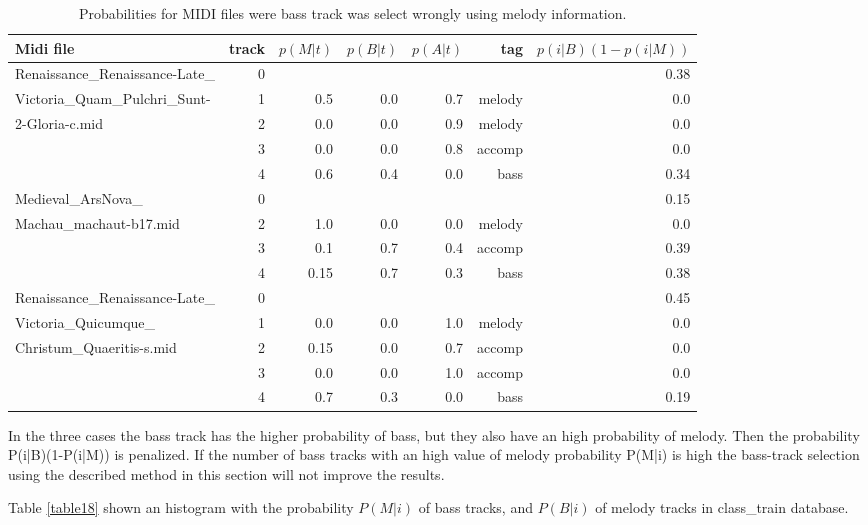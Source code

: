 \documentclass{article}
\begin{document}
\begin{table}
\tiny
\begin{center}
\begin{tabular}{  l | r | r | r | r | r | r }
\hline
Midi file & track & $p(M|t)$ & $p(B|t)$ & $p(A|t)$ & tag & $p(i|B)(1-p(i|M))$ \\
\hline
\hline
Renaissance\_Renaissance-Late\_ & 0 &  &  &  &  & 0.38 \\
Victoria\_Quam\_Pulchri\_Sunt- & 1 & 0.5 & 0.0 & 0.7 & melody & 0.0 \\
 2-Gloria-c.mid  & 2 & 0.0 & 0.0 & 0.9 & melody & 0.0 \\
 & 3 & 0.0 & 0.0 & 0.8 & accomp & 0.0 \\
 & 4 & 0.6 & 0.4 & 0.0 & bass & 0.34 \\
 \hline
Medieval\_ArsNova\_ & 0 &  &  &  &  & 0.15 \\
Machau\_machaut-b17.mid & 2 & 1.0 & 0.0 & 0.0 & melody & 0.0 \\
 & 3 & 0.1 & 0.7 & 0.4 & accomp & 0.39 \\
 & 4 & 0.15 & 0.7 & 0.3 & bass & 0.38 \\
 \hline
Renaissance\_Renaissance-Late\_ & 0 &  &  &  &  & 0.45 \\
Victoria\_Quicumque\_ & 1 & 0.0 & 0.0 & 1.0 & melody & 0.0 \\
Christum\_Quaeritis-s.mid & 2 & 0.15 & 0.0 & 0.7 & accomp & 0.0 \\
 & 3 & 0.0 & 0.0 & 1.0 & accomp & 0.0 \\
 & 4 & 0.7 & 0.3 & 0.0 & bass & 0.19 \\
\hline
\end{tabular}
\caption{Probabilities for MIDI files were bass track was select wrongly using melody information.}
\label{table17}
\end{center}
\end{table}



In the three cases the bass track has the higher probability of bass, but they also have an high probability of melody. Then the probability P(i|B)(1-P(i|M)) is penalized. If the number of bass tracks with an high value of melody probability P(M|i) is high the bass-track selection using the described method in this section will not improve the results.

Table \ref{table18} shown an histogram with the probability $P(M|i)$ of bass tracks, and $P(B|i)$ of melody tracks in class\_train database.
\end{document}
